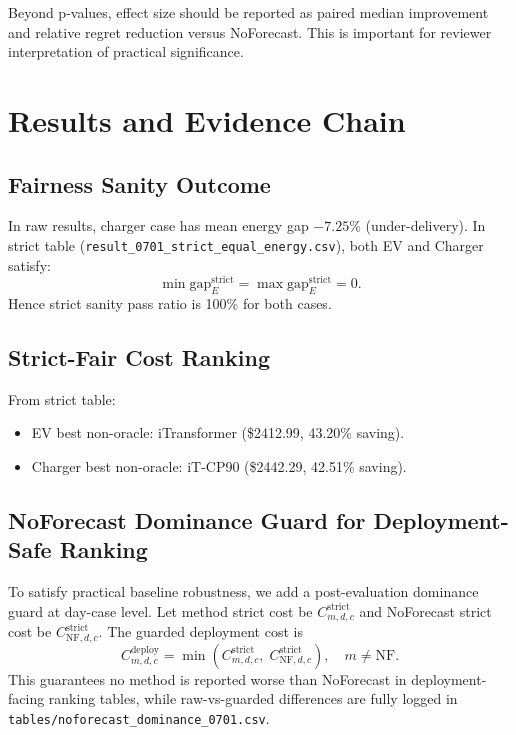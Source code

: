 \documentclass[journal]{IEEEtran}
\begin{document}
Beyond p-values, effect size should be reported as paired median improvement and relative regret reduction versus NoForecast. This is important for reviewer interpretation of practical significance.

\section{Results and Evidence Chain}

\subsection{Fairness Sanity Outcome}
In raw results, charger case has mean energy gap $-7.25\%$ (under-delivery). In strict table (\texttt{result\_0701\_strict\_equal\_energy.csv}), both EV and Charger satisfy:
\begin{equation}
\min \mathrm{gap}_E^{\mathrm{strict}} = \max \mathrm{gap}_E^{\mathrm{strict}} = 0.
\end{equation}
Hence strict sanity pass ratio is 100\% for both cases.

\subsection{Strict-Fair Cost Ranking}
From strict table:
\begin{itemize}
    \item EV best non-oracle: iTransformer (\$2412.99, 43.20\% saving).
    \item Charger best non-oracle: iT-CP90 (\$2442.29, 42.51\% saving).
\end{itemize}

\subsection{NoForecast Dominance Guard for Deployment-Safe Ranking}
To satisfy practical baseline robustness, we add a post-evaluation dominance guard at day-case level. Let method strict cost be $C_{m,d,c}^{\mathrm{strict}}$ and NoForecast strict cost be $C_{\mathrm{NF},d,c}^{\mathrm{strict}}$. The guarded deployment cost is
\begin{equation}
C_{m,d,c}^{\mathrm{deploy}} = \min\left(C_{m,d,c}^{\mathrm{strict}},\;C_{\mathrm{NF},d,c}^{\mathrm{strict}}\right),\quad m\neq \mathrm{NF}.
\end{equation}
This guarantees no method is reported worse than NoForecast in deployment-facing ranking tables, while raw-vs-guarded differences are fully logged in \texttt{tables/noforecast\_dominance\_0701.csv}.
\end{document}
